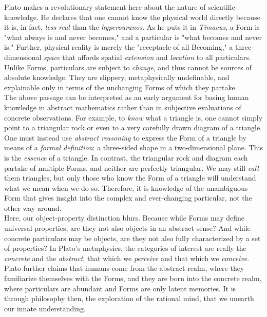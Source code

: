 Plato makes a revolutionary statement here about the nature of scientific knowledge. He declares that one cannot know the physical world directly because it is, in fact, \textit{less real} than the \textit{hyperouranos}. As he puts it in \textit{Timaeus}, a Form is "what always is and never becomes," and a particular is "what becomes and never is." Further, physical reality is merely the "receptacle of all Becoming," a three-dimensional \textit{space} that affords spatial \textit{extension} and \textit{location} to all particulars. Unlike Forms, particulars are subject to \textit{change}, and thus cannot be sources of absolute knowledge. They are slippery, metaphysically undefinable, and explainable only in terms of the unchanging Forms of which they partake. \\


The above passage can be interpreted as an early argument for basing human knowledge in abstract mathematics rather than in subjective evaluations of concrete observations. For example, to \textit{know} what a triangle is, one cannot simply point to a triangular rock or even to a very carefully drawn diagram of a triangle. One must instead use \textit{abstract reasoning} to express the Form of a triangle by means of a \textit{formal definition}: a three-sided shape in a two-dimensional plane. This is the \textit{essence} of a triangle. In contrast, the triangular rock and diagram each partake of multiple Forms, and neither are perfectly triangular. We may still \textit{call} them triangles, but only those who know the Form of a triangle will understand what we mean when we do so. Therefore, it is knowledge of the unambiguous Form that gives insight into the complex and ever-changing particular, not the other way around. \\

Here, our object-property distinction blurs. Because while Forms may define universal properties, are they not also objects in an abstract sense? And while concrete particulars may be objects, are they not also fully characterized by a set of properties? In Plato's metaphysics, the categories of interest are really the \textit{concrete} and the \textit{abstract}, that which we \textit{perceive} and that which we \textit{conceive}. Plato further claims that humans come from the abstract realm, where they familiarize themselves with the Forms, and they are born into the concrete realm, where particulars are abundant and Forms are only latent memories. It is through philosophy then, the exploration of the rational mind, that we unearth our innate understanding. \\

